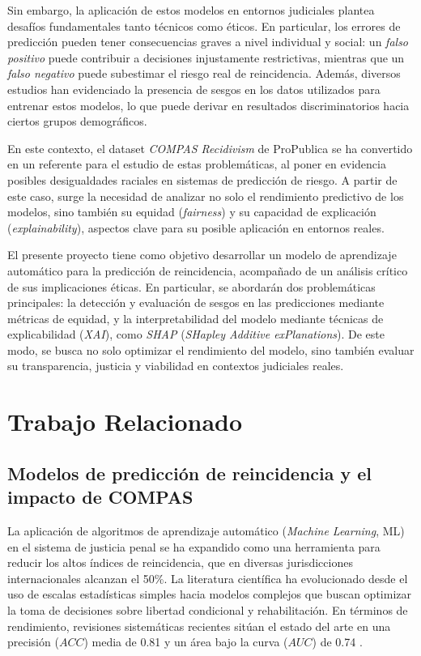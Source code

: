 \documentclass[11pt,a4paper]{article}
\begin{document}
Sin embargo, la aplicación de estos modelos en entornos judiciales plantea desafíos fundamentales tanto técnicos como éticos. En particular, los errores de predicción pueden tener consecuencias graves a nivel individual y social: un \textit{falso positivo} puede contribuir a decisiones injustamente restrictivas, mientras que un \textit{falso negativo} puede subestimar el riesgo real de reincidencia. Además, diversos estudios han evidenciado la presencia de sesgos en los datos utilizados para entrenar estos modelos, lo que puede derivar en resultados discriminatorios hacia ciertos grupos demográficos.

En este contexto, el dataset \textit{COMPAS Recidivism} de ProPublica se ha convertido en un referente para el estudio de estas problemáticas, al poner en evidencia posibles desigualdades raciales en sistemas de predicción de riesgo. A partir de este caso, surge la necesidad de analizar no solo el rendimiento predictivo de los modelos, sino también su equidad (\textit{fairness}) y su capacidad de explicación (\textit{explainability}), aspectos clave para su posible aplicación en entornos reales.

El presente proyecto tiene como objetivo desarrollar un modelo de aprendizaje automático para la predicción de reincidencia, acompañado de un análisis crítico de sus implicaciones éticas. En particular, se abordarán dos problemáticas principales: la detección y evaluación de sesgos en las predicciones mediante métricas de equidad, y la interpretabilidad del modelo mediante técnicas de explicabilidad (\textit{XAI}), como \textit{SHAP} (\textit{SHapley Additive exPlanations}). De este modo, se busca no solo optimizar el rendimiento del modelo, sino también evaluar su transparencia, justicia y viabilidad en contextos judiciales reales.


\section{Trabajo Relacionado}
\label{sec:related}

\subsection{Modelos de predicción de reincidencia y el impacto de COMPAS}

La aplicación de algoritmos de aprendizaje automático (\textit{Machine Learning}, ML) en el sistema de justicia penal se ha expandido como una herramienta para reducir los altos índices de reincidencia, que en diversas jurisdicciones internacionales alcanzan el 50\%. La literatura científica ha evolucionado desde el uso de escalas estadísticas simples hacia modelos complejos que buscan optimizar la toma de decisiones sobre libertad condicional y rehabilitación. En términos de rendimiento, revisiones sistemáticas recientes sitúan el estado del arte en una precisión ($ACC$) media de 0.81 y un área bajo la curva ($AUC$) de 0.74 \cite{travaini2022machine}. 
\end{document}
